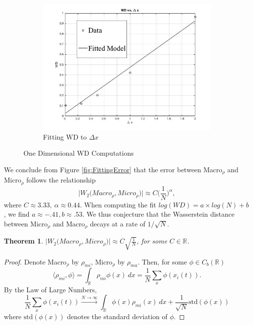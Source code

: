 \documentclass[10pt]{article}
\newtheorem{theorem}{Theorem}
\begin{document}
\begin{figure}
\begin{subfigure}{\linewidth}
\includegraphics[scale = .4]{WDVSDX.jpg}
\caption{Fitting WD to $\Delta x$}
\label{fig: WDVsX}
\end{subfigure}
\caption{One Dimensional WD Computations}
\label{fig:test}
\end{figure}


\noindent We conclude from Figure \ref{fig:FittingError}  that the error between Macro$_\rho$ and Micro$_\rho$ follows the relationship 
\begin{equation*}
\Big|W_2\Big(Macro_\rho, Micro_\rho\Big)\Big| \approx C\Big({\frac{1}{N}}\Big)^{\alpha},
\end{equation*}
 where $C \approx 3.33, \ \alpha \approx 0.44 $. When computing the fit $log(WD) = a\times log(N) + b$, we find $a \approx -.41,  b \approx .53$. We thus conjecture that the Wasserstein distance between Micro$_\rho$ and Macro$_\rho$ decays at a rate of $1/\sqrt{N}$.
\begin{theorem}
$\Big|W_2\Big(Macro_\rho, Micro_\rho\Big)\Big| \approx C\sqrt{\frac{1}{N}}$, for some $C \in \mathbb{R}$.
\end{theorem}
\begin{proof}
Denote Macro$_\rho$ by $\rho_{mi}$, Micro$_\rho$ by $\rho_{ma}$. Then, for some $\phi \in C_b(\mathbb{R})$
\begin{equation*}
\langle \rho_{mi}, \phi \rangle = \int_{\mathbb{R}} \rho_{mi} \phi(x) \ dx = \frac{1}{N}\sum_x \phi(x_i(t)).
\end{equation*}
By the Law of Large Numbers, 
\begin{equation*}
\frac{1}{N}\sum_x \phi(x_i(t)) \xrightarrow{N \rightarrow \infty} \int_{\mathbb{R}} \phi(x)\rho_{mi}(x) \ dx + \frac{1}{\sqrt{N}}\text{std}(\phi(x))
\end{equation*}
where $\text{std}(\phi(x))$ denotes the standard deviation of $\phi$.
\end{proof}
\end{document}
